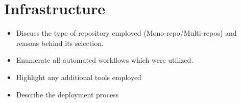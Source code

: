 \section{Infrastructure}
\begin{itemize}
   \item Discuss the type of repository employed (Mono-repo/Multi-repos) and reasons behind its selection.
   \item Enumerate all automated workflows which were utilized.
   \item Highlight any additional tools employed
   \item Describe the deployment process
\end{itemize}